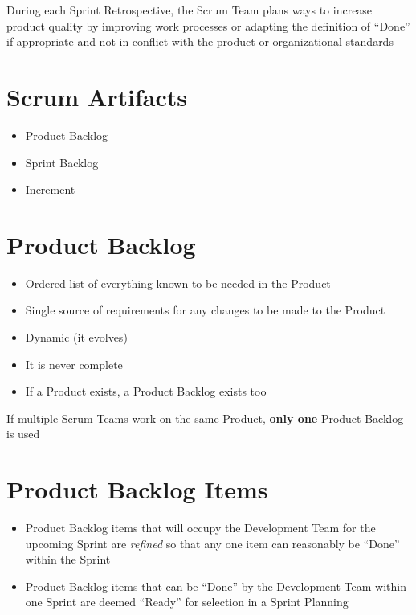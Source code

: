 \documentclass[a4paper,11pt,twocolumn]{article}
\begin{document}
\begin{tcolorbox}[colback=black!8!white,colframe=gray!50!black,title=Note,sharp corners,fonttitle=\normalsize\bfseries,fontupper=\normalsize]
	During each Sprint Retrospective, the Scrum Team plans ways to increase product quality by improving work processes or adapting the definition of ``Done'' if appropriate and not in conflict with the product or organizational standards
\end{tcolorbox}

\section*{Scrum Artifacts}
\begin{itemize}
	\item Product Backlog
	\item Sprint Backlog
	\item Increment
\end{itemize}

\section*{Product Backlog}
\begin{itemize}
	\item Ordered list of everything known to be needed in the Product
	\item Single source of requirements for any changes to be made to the Product
	\item Dynamic (it evolves)
	\item It is never complete
	\item If a Product exists, a Product Backlog exists too
\end{itemize}

\begin{tcolorbox}[colback=black!8!white,colframe=gray!50!black,title=Note,sharp corners,fonttitle=\normalsize\bfseries,fontupper=\normalsize]
	If multiple Scrum Teams work on the same Product, \textbf{only one} Product Backlog is used
\end{tcolorbox}

\section*{Product Backlog Items}
\begin{itemize}
	\item Product Backlog items that will occupy the Development Team for the upcoming Sprint are \textit{refined} so that any one item can reasonably be ``Done'' within the Sprint
    \item Product Backlog items that can be ``Done'' by the Development Team within one Sprint are deemed ``Ready'' for selection in a Sprint Planning
\end{itemize}
\end{document}
